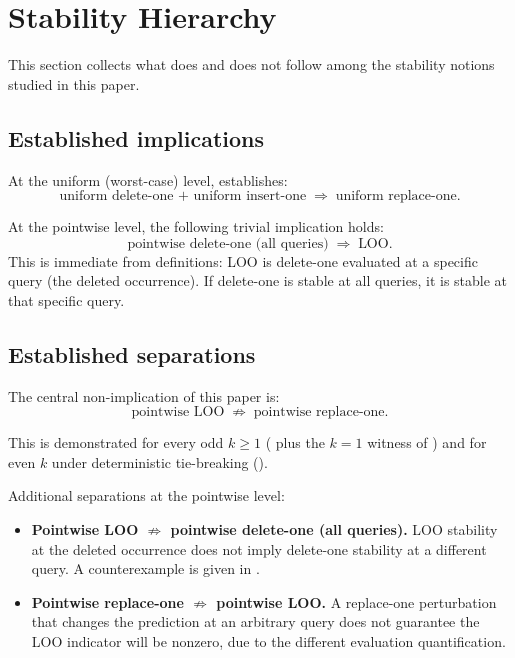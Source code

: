 \section{Stability Hierarchy}
\label{sec:stability-hierarchy}

This section collects what does and does not follow among the stability notions
studied in this paper.

\subsection{Established implications}

At the uniform (worst-case) level,  establishes:
\[
\text{uniform delete-one + uniform insert-one}
\;\Rightarrow\;
\text{uniform replace-one}.
\]

At the pointwise level, the following trivial implication holds:
\[
\text{pointwise delete-one (all queries)}
\;\Rightarrow\;
\text{LOO}.
\]
This is immediate from definitions: LOO is delete-one evaluated at a specific
query (the deleted occurrence).  If delete-one is stable at all queries, it is
stable at that specific query.

\subsection{Established separations}

The central non-implication of this paper is:
\[
\text{pointwise LOO}
\;\not\Rightarrow\;
\text{pointwise replace-one}.
\]

This is demonstrated for every odd $k \ge 1$
( plus the $k=1$ witness of
) and for even $k$ under deterministic tie-breaking
().

Additional separations at the pointwise level:

\begin{itemize}
\item \textbf{Pointwise LOO $\not\Rightarrow$ pointwise delete-one (all
    queries).}  LOO stability at the deleted occurrence does not imply
    delete-one stability at a different query.  A counterexample is given in
    .
\item \textbf{Pointwise replace-one $\not\Rightarrow$ pointwise LOO.}  A
    replace-one perturbation that changes the prediction at an arbitrary query
    does not guarantee the LOO indicator will be nonzero, due to the different
    evaluation quantification.
\end{itemize}

